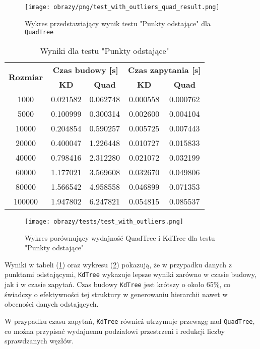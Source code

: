 \documentclass[12pt]{article}
\begin{document}
\begin{figure}[h]
    \centering
    \texttt{[image: obrazy/png/test\_with\_outliers\_quad\_result.png]}
    \caption{Wykres przedstawiający wynik testu "Punkty odstające" dla \texttt{QuadTree}}
    \label{fig:test_with_outliers_quad_result}
\end{figure}

\begin{table}[h]
\centering
\caption{Wyniki dla testu "Punkty odstające"}
\label{tab:test_with_outliers}
\begin{tabular}{ccccc}
\toprule
\multirow{2}{*}{\textbf{Rozmiar}} & \multicolumn{2}{c}{\textbf{Czas budowy [s]}} & \multicolumn{2}{c}{\textbf{Czas zapytania [s]}} \\
\cmidrule(lr){2-3} \cmidrule(lr){4-5}
 & \textbf{KD} & \textbf{Quad} & \textbf{KD} & \textbf{Quad} \\
\midrule
1000   & 0.021582 & 0.062748 & 0.000558 & 0.000762 \\
5000   & 0.100999 & 0.300314 & 0.002600 & 0.004104 \\
10000  & 0.204854 & 0.590257 & 0.005725 & 0.007443 \\
20000  & 0.400047 & 1.226448 & 0.010727 & 0.015833 \\
40000  & 0.798416 & 2.312280 & 0.021072 & 0.032199 \\
60000  & 1.177021 & 3.569608 & 0.032670 & 0.049806 \\
80000  & 1.566542 & 4.958558 & 0.046899 & 0.071353 \\
100000 & 1.947802 & 6.247821 & 0.054815 & 0.085537 \\
\bottomrule
\end{tabular}
\end{table}
\begin{figure}[h]
    \centering
    \texttt{[image: obrazy/tests/test\_with\_outliers.png]}
    \caption{Wykres porównujący wydajność QuadTree i KdTree dla testu "Punkty odstające"}
    \label{fig:test_with_outliers}
\end{figure}
\newpage
\noindent Wyniki w tabeli (\ref{tab:test_with_outliers}) oraz wykresu (\ref{fig:test_with_outliers}) pokazują, że w przypadku danych z punktami odstającymi, \texttt{KdTree} wykazuje lepsze wyniki zarówno w czasie budowy, jak i w czasie zapytań. Czas budowy \texttt{KdTree} jest krótszy o około 65\%, co świadczy o efektywności tej struktury w generowaniu hierarchii nawet w obecności danych odstających.

\noindent W przypadku czasu zapytań, \texttt{KdTree} również utrzymuje przewagę nad \texttt{QuadTree}, co można przypisać wydajnemu podziałowi przestrzeni i redukcji liczby sprawdzanych węzłów.
\end{document}
